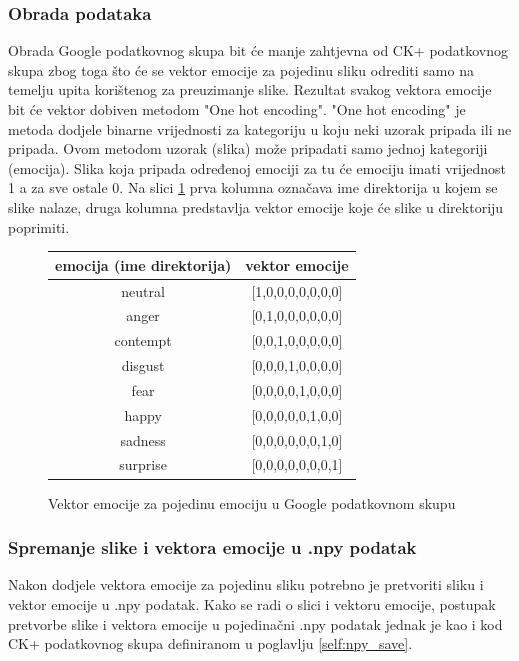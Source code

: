 \documentclass[times, utf8, zavrsni,numeric]{fer}
\begin{document}
\subsubsection{Obrada podataka}
Obrada Google podatkovnog skupa bit će manje zahtjevna od CK+ podatkovnog skupa zbog toga što će se vektor emocije za pojedinu sliku odrediti samo na temelju upita korištenog za preuzimanje slike. Rezultat svakog vektora emocije bit će vektor dobiven metodom "One hot encoding". "One hot encoding" je metoda dodjele binarne vrijednosti za kategoriju u koju neki uzorak pripada ili ne pripada\cite{one_hot_encoding}. Ovom metodom uzorak (slika) može pripadati samo jednoj kategoriji (emocija). Slika koja pripada određenoj emociji za tu će emociju imati vrijednost 1 a za sve ostale 0. Na slici \ref{pic:google_emotion_emo_vector} prva kolumna označava ime direktorija u kojem se slike nalaze, druga kolumna predstavlja vektor emocije koje će slike u direktoriju poprimiti.

\begin{figure}[H]
\centering
\begin{tabular}{|c|c|} 
\hline
emocija (ime direktorija) & vektor emocije \\
\hline
neutral & [1,0,0,0,0,0,0,0] \\
anger	& [0,1,0,0,0,0,0,0] \\
contempt & [0,0,1,0,0,0,0,0] \\
disgust & [0,0,0,1,0,0,0,0]\\
fear  & [0,0,0,0,1,0,0,0]\\
happy & [0,0,0,0,0,1,0,0]\\
sadness & [0,0,0,0,0,0,1,0]\\
surprise & [0,0,0,0,0,0,0,1]\\
\hline
\end{tabular}
\caption{Vektor emocije za pojedinu emociju u Google podatkovnom skupu}
\label{pic:google_emotion_emo_vector}
\end{figure}

\subsubsection{Spremanje slike i vektora emocije u .npy podatak}
Nakon dodjele vektora emocije za pojedinu sliku potrebno je pretvoriti sliku i vektor emocije u .npy podatak. Kako se radi o slici i vektoru emocije, postupak pretvorbe slike i vektora emocije u pojedinačni .npy podatak jednak je kao i kod CK+ podatkovnog skupa definiranom u poglavlju \ref{self:npy_save}.
\end{document}
